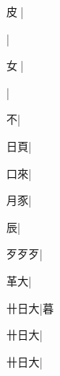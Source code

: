 \begin{multicols}{2}
{{\cjk{}{\cnsym{}　}皮{\cnjzr{}}}\mktsJzrVerticalBar{}{\cjk{}{\cnsym{}　}{\cnsym{}　}{\cnsym{}　}}|{}\par
{}\mktsJzrVerticalBar{}{\cjk{}{\cnsym{}　}{\cnsym{}　}{\cnsym{}　}}|{}\par
{\cjk{}{\cnsym{}　}女{\cnjzr{}}}\mktsJzrVerticalBar{}{\cjk{}{\cnsym{}　}{\cnsym{}　}{\cnsym{}　}}|{}\par
{}\mktsJzrVerticalBar{}{\cjk{}{\cnsym{}　}{\cnsym{}　}{\cnsym{}　}}|{}\par
{\cjk{}{\cnsym{}　}{\cnsym{}　}不}\mktsJzrVerticalBar{}{\cjk{}{\cnsym{}　}{\cnsym{}　}{\cnsym{}　}}|{}\par
{\cjk{}{\cnsym{}　}日頁}\mktsJzrVerticalBar{}{\cjk{}{\cnsym{}　}{\cnsym{}　}{\cnsym{}　}}|{}\par
{\cjk{}{\cnsym{}　}口來}\mktsJzrVerticalBar{}{\cjk{}{\cnsym{}　}{\cnsym{}　}{\cnsym{}　}}|{}\par
{\cjk{}{\cnsym{}　}月豕}\mktsJzrVerticalBar{}{\cjk{}{\cnsym{}　}{\cnsym{}　}{\cnsym{}　}}|{}\par
{\cjk{}{\cnsym{}　}{\cnsym{}　}辰}\mktsJzrVerticalBar{}{\cjk{}{\cnsym{}　}{\cnsym{}　}{\cnsym{}　}}|{}\par
{\cjk{}歹歹歹}\mktsJzrVerticalBar{}{\cjk{}{\cnsym{}　}{\cnsym{}　}{\cnsym{}　}}|{}\par
{\cjk{}{\cnsym{}　}革大}\mktsJzrVerticalBar{}{\cjk{}{\cnsym{}　}{\cnsym{}　}{\cnsym{}　}}|{}\par
{\cjk{}卄日大}\mktsJzrVerticalBar{}{\cjk{}{\cnsym{}　}{\cnsym{}　}{\cnsym{}　}}|{\cjk{}暮}\par
{\cjk{}卄日大}|{}\par
{\cjk{}卄日大}|{}\par
}
\end{multicols}
